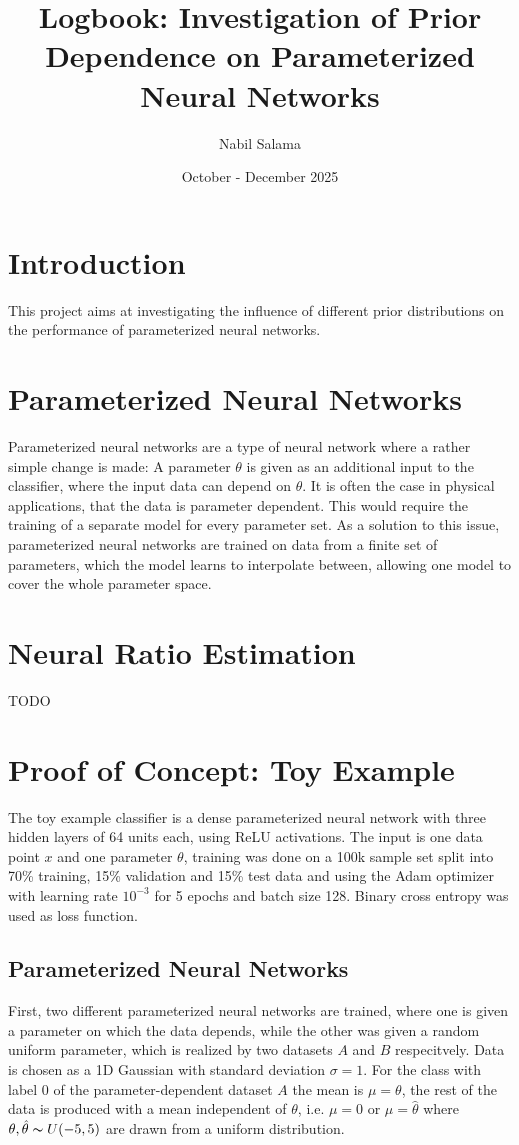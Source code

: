 \documentclass{article}
\title{Logbook: Investigation of Prior Dependence on Parameterized Neural Networks}
\author{Nabil Salama}
\date{October - December 2025}
\begin{document}
\maketitle\textit{}

\section{Introduction}
This project aims at investigating the influence of different prior distributions on the performance of parameterized neural networks.

\section{Parameterized Neural Networks}
Parameterized neural networks are a type of neural network where a rather simple change is made:
A parameter $\theta$ is given as an additional input to the classifier, where the input data can depend on $\theta$.
It is often the case in physical applications, that the data is parameter dependent. This would require the training of a separate
model for every parameter set. As a solution to this issue, parameterized neural networks are trained on data from a finite set of
parameters, which the model learns to interpolate between, allowing one model to cover the whole parameter space.

\section{Neural Ratio Estimation}
TODO

\section{Proof of Concept: Toy Example}

The toy example classifier is a dense parameterized neural network with three hidden layers of 64 units each, using ReLU activations.
The input is one data point $x$ and one parameter $\theta$, training was done on a 100k sample set split into 70\% training, 15\% validation and 15\% test data
and using the Adam optimizer with learning rate $10^{-3}$ for 5 epochs and batch size 128. Binary cross entropy was used as loss function.

\subsection{Parameterized Neural Networks}
First, two different parameterized neural networks are trained, where one is given a parameter on which the data depends, while the other was
given a random uniform parameter, which is realized by two datasets $A$ and $B$ respecitvely.
Data is chosen as a 1D Gaussian with standard deviation $\sigma=1$.
For the class with label 0 of the parameter-dependent dataset $A$ the mean is $\mu = \theta$, the rest of the data is produced with a mean independent of $\theta$,
i.e. $\mu = 0$ or $\mu=\hat\theta$ where $\theta, \hat\theta \thicksim U(-5, 5)$ are drawn from a uniform distribution.
\end{document}
